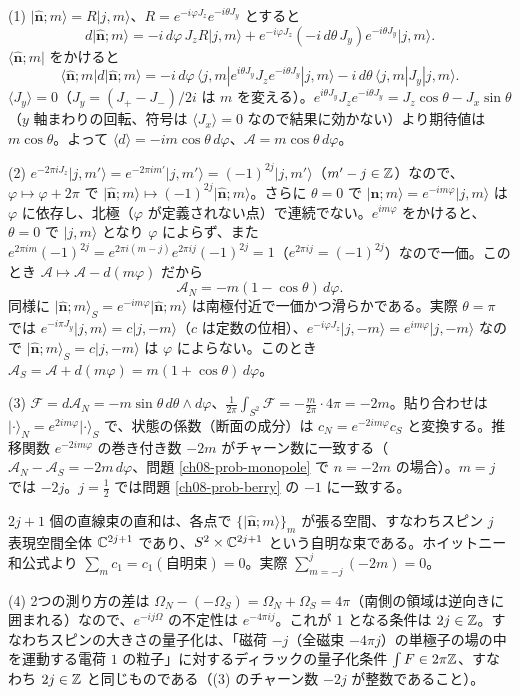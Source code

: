 \begin{solution}
(1) $\lvert\hat{\bm n};m\rangle=R\lvert j,m\rangle$、$R=e^{-i\varphi J_z}e^{-i\theta J_y}$ とすると
\[
d\lvert\hat{\bm n};m\rangle=-i\,d\varphi\,J_zR\lvert j,m\rangle+e^{-i\varphi J_z}(-i\,d\theta\,J_y)e^{-i\theta J_y}\lvert j,m\rangle .
\]
$\langle\hat{\bm n};m|$ をかけると
\[
\langle\hat{\bm n};m|d|\hat{\bm n};m\rangle=-i\,d\varphi\,\langle j,m|e^{i\theta J_y}J_ze^{-i\theta J_y}|j,m\rangle-i\,d\theta\,\langle j,m|J_y|j,m\rangle .
\]
$\langle J_y\rangle=0$（$J_y=(J_+-J_-)/2i$ は $m$ を変える）。$e^{i\theta J_y}J_ze^{-i\theta J_y}=J_z\cos\theta-J_x\sin\theta$（$y$ 軸まわりの回転、符号は $\langle J_x\rangle=0$ なので結果に効かない）より期待値は $m\cos\theta$。よって $\langle d\rangle=-im\cos\theta\,d\varphi$、$\mathcal A=m\cos\theta\,d\varphi$。

(2) $e^{-2\pi iJ_z}\lvert j,m'\rangle=e^{-2\pi im'}\lvert j,m'\rangle=(-1)^{2j}\lvert j,m'\rangle$（$m'-j\in\mathbb{Z}$）なので、$\varphi\mapsto\varphi+2\pi$ で $\lvert\hat{\bm n};m\rangle\mapsto(-1)^{2j}\lvert\hat{\bm n};m\rangle$。さらに $\theta=0$ で $\lvert\hat{\bm n};m\rangle=e^{-im\varphi}\lvert j,m\rangle$ は $\varphi$ に依存し、北極（$\varphi$ が定義されない点）で連続でない。$e^{im\varphi}$ をかけると、$\theta=0$ で $\lvert j,m\rangle$ となり $\varphi$ によらず、また $e^{2\pi im}(-1)^{2j}=e^{2\pi i(m-j)}e^{2\pi ij}(-1)^{2j}=1$（$e^{2\pi ij}=(-1)^{2j}$）なので一価。このとき $\mathcal A\mapsto\mathcal A-d(m\varphi)$ だから
\[
\mathcal A_N=-m(1-\cos\theta)\,d\varphi .
\]
同様に $\lvert\hat{\bm n};m\rangle_S=e^{-im\varphi}\lvert\hat{\bm n};m\rangle$ は南極付近で一価かつ滑らかである。実際 $\theta=\pi$ では $e^{-i\pi J_y}\lvert j,m\rangle=c\lvert j,-m\rangle$（$c$ は定数の位相）、$e^{-i\varphi J_z}\lvert j,-m\rangle=e^{im\varphi}\lvert j,-m\rangle$ なので $\lvert\hat{\bm n};m\rangle_S=c\lvert j,-m\rangle$ は $\varphi$ によらない。このとき $\mathcal A_S=\mathcal A+d(m\varphi)=m(1+\cos\theta)\,d\varphi$。

(3) $\mathcal F=d\mathcal A_N=-m\sin\theta\,d\theta\wedge d\varphi$、$\frac1{2\pi}\int_{S^2}\mathcal F=-\frac{m}{2\pi}\cdot4\pi=-2m$。貼り合わせは $\lvert\cdot\rangle_N=e^{2im\varphi}\lvert\cdot\rangle_S$ で、状態の係数（断面の成分）は $c_N=e^{-2im\varphi}c_S$ と変換する。推移関数 $e^{-2im\varphi}$ の巻き付き数 $-2m$ がチャーン数に一致する（$\mathcal A_N-\mathcal A_S=-2m\,d\varphi$、問題 \ref{ch08-prob-monopole} で $n=-2m$ の場合）。$m=j$ では $-2j$。$j=\frac12$ では問題 \ref{ch08-prob-berry} の $-1$ に一致する。

$2j+1$ 個の直線束の直和は、各点で $\{\lvert\hat{\bm n};m\rangle\}_m$ が張る空間、すなわちスピン $j$ 表現空間全体 $\mathbb{C}^{2j+1}$ であり、$S^2\times\mathbb{C}^{2j+1}$ という自明な束である。ホイットニー和公式より $\sum_mc_1=c_1(\text{自明束})=0$。実際 $\sum_{m=-j}^j(-2m)=0$。

(4) 2つの測り方の差は $\Omega_N-(-\Omega_S)=\Omega_N+\Omega_S=4\pi$（南側の領域は逆向きに囲まれる）なので、$e^{-ij\Omega}$ の不定性は $e^{-4\pi ij}$。これが $1$ となる条件は $2j\in\mathbb{Z}$。すなわちスピンの大きさの量子化は、「磁荷 $-j$（全磁束 $-4\pi j$）の単極子の場の中を運動する電荷 $1$ の粒子」に対するディラックの量子化条件 $\int F\in2\pi\mathbb{Z}$、すなわち $2j\in\mathbb{Z}$ と同じものである（(3) のチャーン数 $-2j$ が整数であること）。
\end{solution}

